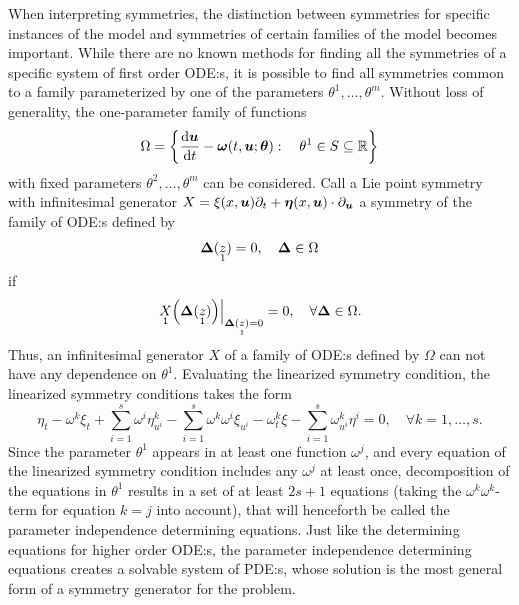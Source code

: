 When interpreting symmetries, the distinction between symmetries for specific instances of the model and symmetries of certain families of the model becomes important.
While there are no known methods for finding all the symmetries of a specific system of first order ODE:s, it is possible to find all symmetries common to a family parameterized by one of the parameters \(\theta^1, \dots, \theta^m\).
Without loss of generality, the one-parameter family of functions
\begin{equation*} %
  \Omega = \left\{\diff{\vect{u}}{t} - \vect{\omega}(t, \vect{u}; \vect{\theta}):\quad \theta^1 \in S \subseteq \reals \right\}
\end{equation*}
with fixed parameters \(\theta^2, \dots, \theta^m\) can be considered.
Call a Lie point symmetry with infinitesimal generator \(X = \xi(x, \vect{u}) \partial_t + \vect{\eta}(x, \vect{u}) \cdot \partial_{\vect{u}}\) a symmetry of the family of ODE:s defined by
\begin{equation*}
  \vect{\Delta}(\prolong{z}{1}) = 0 ,\quad \vect{\Delta} \in \Omega
\end{equation*}
if
\begin{equation*}
  \eval{\prolong{X}{1}\left(\vect{\Delta}(\prolong{z}{1})\right)}_{\vect{\Delta}(\prolong{z}{1}) = 0} = 0 ,\quad \forall \vect{\Delta} \in \Omega.
\end{equation*}
Thus, an infinitesimal generator \(X\) of a family of ODE:s defined by \(\Omega\) can not have any dependence on \(\theta^1\).
Evaluating the linearized symmetry condition, the linearized symmetry conditions takes the form
\begin{equation*}
  \eta_t - \omega^k \xi_t + \sum_{i=1}^s \omega^i \eta^k_{u^i} - \sum_{i=1}^s \omega^k \omega^i \xi_{u^i} -
  \omega^k_t \xi - \sum_{i=1}^s \omega^k_{u^i} \eta^i = 0 ,\quad \forall k = 1, \dots, s.
\end{equation*}
Since the parameter \(\theta^1\) appears in at least one function \(\omega^j\), and every equation of the linearized symmetry condition includes any \(\omega^j\) at least once, decomposition of the equations in \(\theta^1\) results in a set of at least \(2 s + 1\) equations (taking the \(\omega^k \omega^k\)-term for equation \(k = j\) into account), that will henceforth be called the parameter independence determining equations.
Just like the determining equations for higher order ODE:s, the parameter independence determining equations creates a solvable system of PDE:s, whose solution is the most general form of a symmetry generator for the problem.

